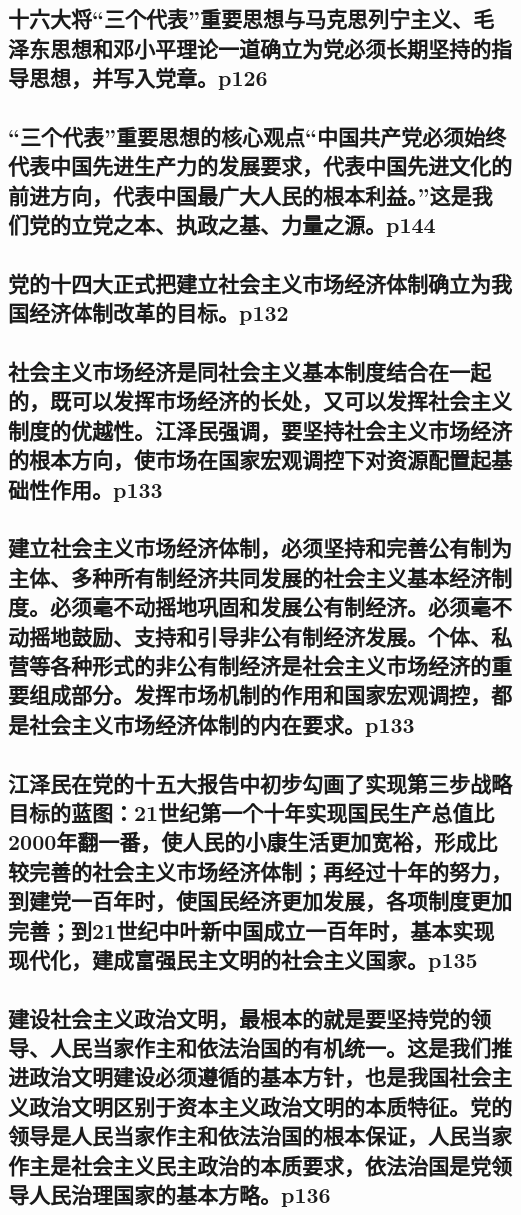 \documentclass[UTF8]{ctexart}
\begin{document}
\subsection{十六大将“三个代表”重要思想与马克思列宁主义、毛泽东思想和邓小平理论一道确立为党必须长期坚持的指导思想，并写入党章。p126}
\subsection{“三个代表”重要思想的核心观点“中国共产党必须始终代表中国先进生产力的发展要求，代表中国先进文化的前进方向，代表中国最广大人民的根本利益。”这是我们党的立党之本、执政之基、力量之源。p144}
\subsection{党的十四大正式把建立社会主义市场经济体制确立为我国经济体制改革的目标。p132}
\subsection{社会主义市场经济是同社会主义基本制度结合在一起的，既可以发挥市场经济的长处，又可以发挥社会主义制度的优越性。江泽民强调，要坚持社会主义市场经济的根本方向，使市场在国家宏观调控下对资源配置起基础性作用。p133}
\subsection{建立社会主义市场经济体制，必须坚持和完善公有制为主体、多种所有制经济共同发展的社会主义基本经济制度。必须毫不动摇地巩固和发展公有制经济。必须毫不动摇地鼓励、支持和引导非公有制经济发展。个体、私营等各种形式的非公有制经济是社会主义市场经济的重要组成部分。发挥市场机制的作用和国家宏观调控，都是社会主义市场经济体制的内在要求。p133}
\subsection{江泽民在党的十五大报告中初步勾画了实现第三步战略目标的蓝图：21世纪第一个十年实现国民生产总值比2000年翻一番，使人民的小康生活更加宽裕，形成比较完善的社会主义市场经济体制；再经过十年的努力，到建党一百年时，使国民经济更加发展，各项制度更加完善；到21世纪中叶新中国成立一百年时，基本实现现代化，建成富强民主文明的社会主义国家。p135}
\newpage
\subsection{建设社会主义政治文明，最根本的就是要坚持党的领导、人民当家作主和依法治国的有机统一。这是我们推进政治文明建设必须遵循的基本方针，也是我国社会主义政治文明区别于资本主义政治文明的本质特征。党的领导是人民当家作主和依法治国的根本保证，人民当家作主是社会主义民主政治的本质要求，依法治国是党领导人民治理国家的基本方略。p136}
\end{document}
